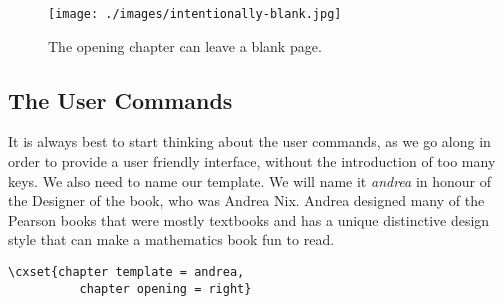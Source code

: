 \begin{figure}[htbp]
\texttt{[image: ./images/intentionally-blank.jpg]}
\caption{The opening chapter can leave a blank page. }
\label{fig:linear2}
\end{figure}

\subsection{The User Commands}

It is always best to start thinking about the user commands, as we go along in order to provide a user friendly
interface, without the introduction of too many keys. We also need to name our template. We will name it \emph{andrea} in honour of the Designer of the book, who was Andrea Nix. Andrea designed many of the Pearson books that were mostly textbooks and has a unique distinctive design style that can make a mathematics book fun to read.

\begin{verbatim}
\cxset{chapter template = andrea,
          chapter opening = right}
\end{verbatim}

\def\fullwidthrule{%
\bgroup
\color{thesectioncolor}
\noindent\makebox[\linewidth]{\rule{\paperwidth}{2.5pt}}%
\egroup
}

\fullwidthrule
\fullwidthrule

